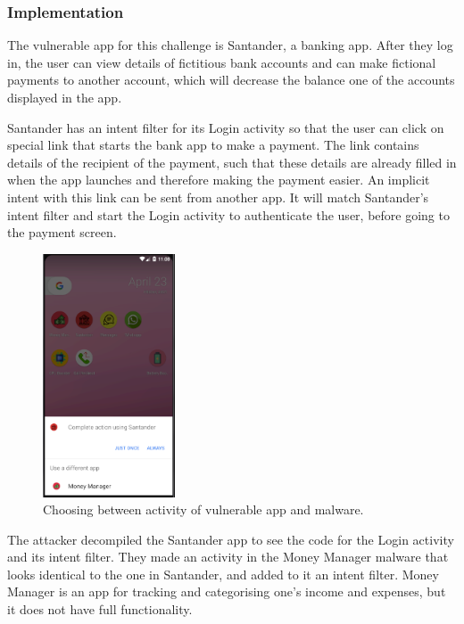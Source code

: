     \subsubsection{Implementation}
        \label{subsubsec:activity_hijack_implementation}
        
    The vulnerable app for this challenge is Santander, a banking app. After they log in, the user can view details of fictitious bank accounts and can make fictional payments to another account, which will decrease the balance one of the accounts displayed in the app.
    
    Santander has an intent filter for its Login activity so that the user can click on special link that starts the bank app to make a payment. The link contains details of the recipient of the payment, such that these details are already filled in when the app launches and therefore making the payment easier. An implicit intent with this link can be sent from another app. It will match Santander's intent filter and start the Login activity to authenticate the user, before going to the payment screen.
    
    \begin{figure}
        \centering
        \includegraphics[width=0.35\textwidth]{graphics/activity_hijack.PNG}
        \caption{Choosing between activity of vulnerable app and malware.}
        \label{fig:activity_hijack}
    \end{figure}

    The attacker decompiled the Santander app to see the code for the Login activity and its intent filter. They made an activity in the Money Manager malware that looks identical to the one in Santander, and added to it an intent filter. Money Manager is an app for tracking and categorising one's income and expenses, but it does not have full functionality.
    
